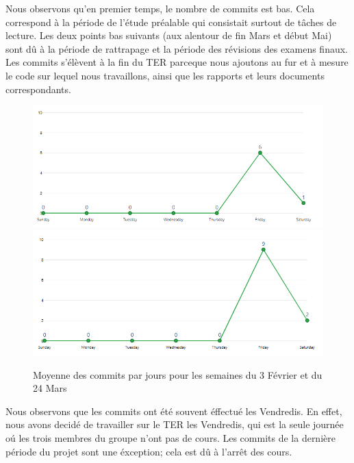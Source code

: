 \documentclass[12pt,a4paper]{report}
\begin{document}
Nous observons qu'en premier temps, le nombre de commits est bas. Cela correspond à  la période de l'étude préalable qui consistait surtout de tâches de lecture. 
Les deux points bas suivants (aux alentour de fin Mars et début Mai) sont dû à la période de rattrapage et la période des révisions des examens finaux.
Les commits s'élèvent à la fin du TER parceque nous ajoutons au fur et à mesure le code sur lequel nous travaillons, ainsi que les rapports et leurs documents correspondants.

%
\begin{figure}[!ht]
\hspace*{-4cm}                
\includegraphics[scale=0.60]{images/contributor_week_feb3.PNG}
\hspace*{1.6cm}    
\includegraphics[scale=0.60]{images/contributor_week_march24.PNG}
\caption{Moyenne des commits par jours pour les semaines du 3 Février et du 24 Mars}
\end{figure}

Nous observons que les commits ont été souvent éffectué les Vendredis. En effet, nous avons decidé de travailler sur le TER les Vendredis, qui est la seule journée oú les trois membres du groupe n'ont pas de cours. Les commits de la dernière période du projet sont une éxception; cela est dû à l'arrêt des cours.  
\end{document}
